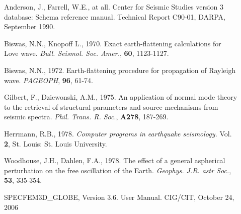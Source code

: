 \documentclass[11pt]{article}
\begin{document}
\begin{description}
\item[] Anderson, J., Farrell, W.E., at all. Center for Seismic
Studies version 3 database: Schema reference manual. Technical Report
C90-01, DARPA, September 1990.
\item[] Biswas, N.N., Knopoff L., 1970. Exact earth-flattening calculations
for Love wave. {\it Bull. Seismol. Soc. Amer.}, {\bf 60}, 1123-1127.
\item[] Biswas, N.N., 1972. Earth-flattening procedure for propagation of
Rayleigh wave. {\it PAGEOPH}, {\bf 96}, 61-74.
\item[] Gilbert, F., Dziewonski, A.M., 1975. An application of normal
mode theory to the retrieval of structural parameters and source mechanisms
from seismic spectra. {\it Phil. Trans. R. Soc}., {\bf A278}, 187-269.
\item[] Herrmann, R.B., 1978. {\it Computer programs in earthquake seismology.}
Vol. {\bf 2}, St. Louis: St. Louis University.
\item[] Woodhouse, J.H., Dahlen, F.A., 1978. The effect of  a general aspherical
perturbation on the free oscillation of the Earth. {\it Geophys. J.R.
astr Soc.}, {\bf 53}, 335-354.
\item[] SPECFEM3D\_GLOBE, Version 3.6. User Manual. CIG/CIT, October 24, 2006
\end{description}
%
\appendix
\makeatletter
\def\@seccntformat#1{\csname Pref@#1\endcsname \csname the#1\endcsname\quad}
\def\Pref@section{Appendix~}
\makeatother




\end{document}
